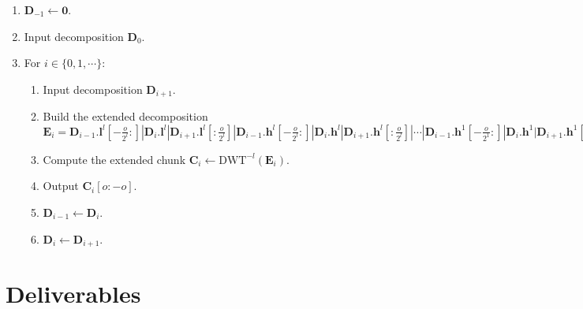 \begin{enumerate}
\item ${\mathbf D}_{-1}\leftarrow{\mathbf 0}$.
\item Input decomposition ${\mathbf D}_0$.
\item For $i\in\{0,1,\cdots\}$:
  \begin{enumerate}
  \item Input decomposition ${\mathbf D}_{i+1}$.
  \item Build the extended decomposition ${\mathbf E}_i =
    {\mathbf D}_{i-1}.{\mathbf l}^l[-\frac{o}{2^l}:]|{\mathbf D}_i.{\mathbf l}^l|{\mathbf D}_{i+1}.{\mathbf l}^l[:\frac{o}{2^l}]|{\mathbf D}_{i-1}.{\mathbf h}^l[-\frac{o}{2^l}:]|{\mathbf D}_i.{\mathbf h}^l|{\mathbf D}_{i+1}.{\mathbf h}^l[:\frac{o}{2^l}]|\cdots|{\mathbf D}_{i-1}.{\mathbf h}^1[-\frac{o}{2^1}:]|{\mathbf D}_i.{\mathbf h}^1|{\mathbf D}_{i+1}.{\mathbf h}^1[:\frac{o}{2^1}].$
  \item Compute the extended chunk ${\mathbf C}_i\leftarrow\text{DWT}^{-l}({\mathbf E}_i)$.
  \item Output ${\mathbf C}_i[o:-o]$.
  \item ${\mathbf D}_{i-1} \leftarrow {\mathbf D}_i$.
  \item ${\mathbf D}_i \leftarrow {\mathbf D}_{i+1}$.
  \end{enumerate}
\end{enumerate}





\section{Deliverables}

